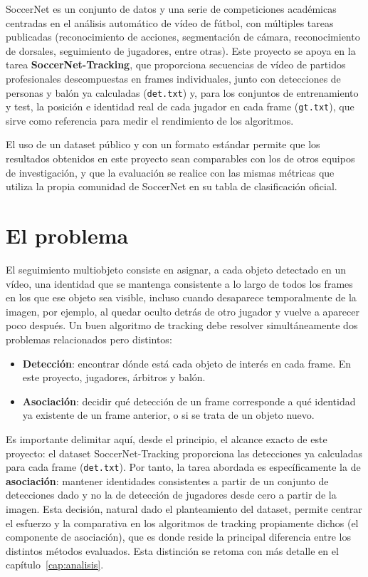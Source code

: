 SoccerNet es un conjunto de datos y una serie de competiciones académicas
centradas en el análisis automático de vídeo de fútbol, con múltiples tareas
publicadas (reconocimiento de acciones, segmentación de cámara, reconocimiento
de dorsales, seguimiento de jugadores, entre otras). Este proyecto se apoya en
la tarea \textbf{SoccerNet-Tracking}, que proporciona secuencias de vídeo de
partidos profesionales descompuestas en frames individuales, junto con
detecciones de personas y balón ya calculadas (\texttt{det.txt}) y, para los
conjuntos de entrenamiento y test, la posición e identidad real de cada
jugador en cada frame (\texttt{gt.txt}), que sirve como referencia para medir
el rendimiento de los algoritmos.

El uso de un dataset público y con un formato estándar permite que los resultados obtenidos en
este proyecto sean comparables con los de otros equipos de investigación, y
que la evaluación se realice con las mismas métricas que utiliza la propia
comunidad de SoccerNet en su tabla de clasificación oficial.

\section{El problema}
\label{sec:intro-problema}

El seguimiento multiobjeto consiste en asignar, a cada objeto detectado en un
vídeo, una identidad que se mantenga consistente a lo largo de todos los
frames en los que ese objeto sea visible, incluso cuando desaparece
temporalmente de la imagen, por ejemplo, al quedar oculto detrás de otro
jugador y vuelve a aparecer poco después. Un buen algoritmo de tracking debe
resolver simultáneamente dos problemas relacionados pero distintos:

\begin{itemize}
  \item \textbf{Detección}: encontrar dónde está cada objeto de interés en
        cada frame. En este proyecto, jugadores, árbitros y balón.
  \item \textbf{Asociación}: decidir qué detección de un frame corresponde a
        qué identidad ya existente de un frame anterior, o si se trata de un
        objeto nuevo.
\end{itemize}

Es importante delimitar aquí, desde el principio, el alcance exacto de este
proyecto: el dataset SoccerNet-Tracking proporciona las detecciones ya
calculadas para cada frame (\texttt{det.txt}). Por tanto, la tarea abordada es
específicamente la de \textbf{asociación}: mantener identidades
consistentes a partir de un conjunto de detecciones dado y no la de
detección de jugadores desde cero a partir de la imagen. Esta
decisión, natural dado el planteamiento del dataset, permite centrar el
esfuerzo y la comparativa en los algoritmos de tracking propiamente dichos
(el componente de asociación), que es donde reside la principal diferencia
entre los distintos métodos evaluados. Esta distinción se retoma con más
detalle en el capítulo~\ref{cap:analisis}.

